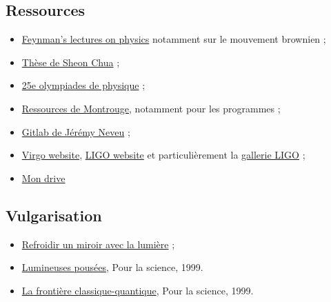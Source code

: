 \documentclass[12pt,a4paper]{article}
\begin{document}
\subsection*{Ressources}

\begin{itemize}
\item \href{https://www.feynmanlectures.caltech.edu/I_toc.html}{Feynman's lectures on physics} notamment sur le mouvement brownien ; 
\item \href{https://www.google.com/url?sa=t&rct=j&q=&esrc=s&source=web&cd=&ved=2ahUKEwjG_46I64rqAhXNzaQKHVsDClg4ChAWMAR6BAgDEAE&url=https\%3A\%2F\%2Fs3.cern.ch\%2Finspire-prod-files-4\%2F47ec074a2c30485f4a7685f9432e2f00&usg=AOvVaw0vEuXse2zJa-8kvqizXVrd}{Thèse de Sheon Chua} ;
\item \href{https://odpf.org/la-xxve-2018.html}{25e olympiades de physique} ;
\item \href{http://ressources.agreg.phys.ens.fr/ressources/}{Ressources de Montrouge}, notamment pour les programmes ;
\item \href{https://gitlab.in2p3.fr/Jeremy}{Gitlab de Jérémy Neveu} ;
\item \href{http://public.virgo-gw.eu/language/fr/}{Virgo website}, \href{https://www.ligo.caltech.edu/}{LIGO website} et particulièrement la \href{https://www.ligo.caltech.edu/gallery}{gallerie LIGO} ;
\item \href{https://drive.google.com/drive/folders/17qSpuQmLuE2H70xPNKxf3b3JaIF-BEVp?usp=sharing}{Mon drive}
\end{itemize}

\subsection*{Vulgarisation}

\begin{itemize}
\item \href{https://nanopdf.com/download/refroidir-un-miroir-avec-la-lumiere_pdf}{Refroidir un miroir avec la lumière} ;
\item \href{https://www.pourlascience.fr/sd/physique/lumineuses-poussees-1143.php}{Lumineuses pousées}, Pour la science, 1999.
\item \href{https://www.pourlascience.fr/sd/physique/la-frontiere-classique-quantique-1533.php}{La frontière classique-quantique}, Pour la science, 1999.
\end{itemize}
\end{document}
